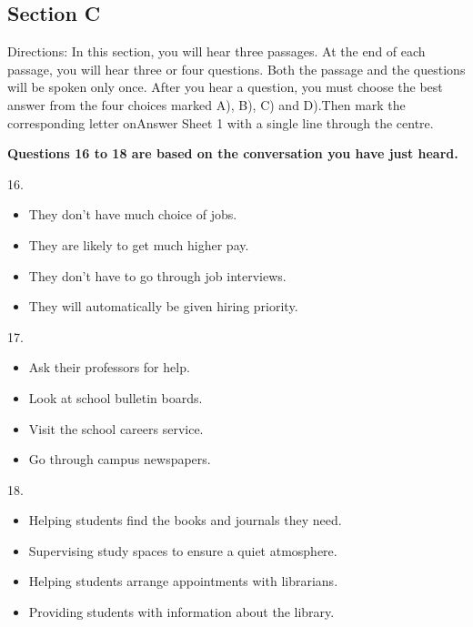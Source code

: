 \documentclass[UTF8,11pt]{ctexart}
\begin{document}
\subsection*{\textbf{Section C}}


Directions: In this section, you will hear three passages. At the end of each passage, you will hear three or four questions. Both the passage and the questions will be spoken only once. After you hear a question, you must choose the best answer from the four choices marked A), B), C) and D).Then mark the corresponding letter onAnswer Sheet 1 with a single line through the centre.


\textbf{Questions 16 to 18 are based on the conversation you have just heard.}


16.


\begin{itemize}[leftmargin=2em,itemsep=.2em,topsep=.4em]\item[A.] They don't have much choice of jobs.
\item[B.] They are likely to get much higher pay.
\item[C.] They don't have to go through job interviews.
\item[D.] They will automatically be given hiring priority.
\end{itemize}

17.


\begin{itemize}[leftmargin=2em,itemsep=.2em,topsep=.4em]\item[A.] Ask their professors for help.
\item[B.] Look at school bulletin boards.
\item[C.] Visit the school careers service.
\item[D.] Go through campus newspapers.
\end{itemize}

18.


\begin{itemize}[leftmargin=2em,itemsep=.2em,topsep=.4em]\item[A.] Helping students find the books and journals they need.
\item[B.] Supervising study spaces to ensure a quiet atmosphere.
\end{itemize}

\begin{itemize}[leftmargin=2em,itemsep=.2em,topsep=.4em]\item[C.] Helping students arrange appointments with librarians.
\item[D.] Providing students with information about the library.
\end{itemize}
\end{document}
